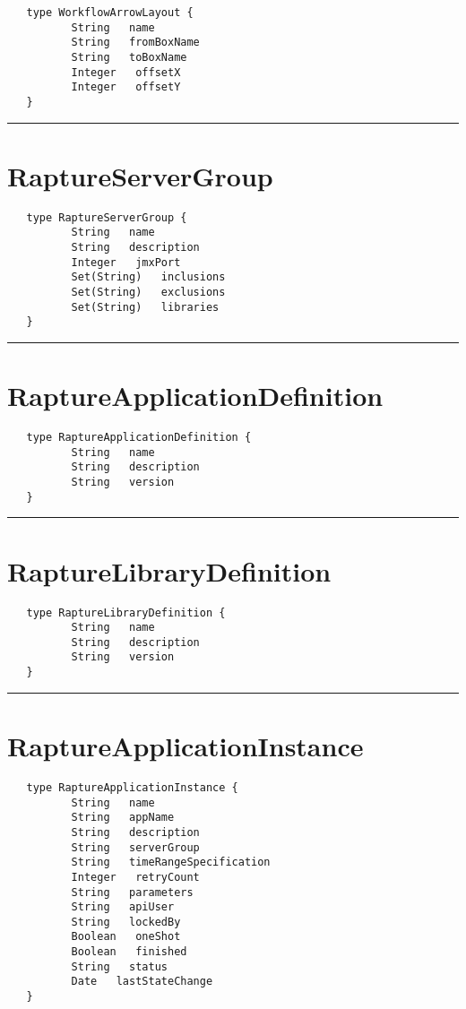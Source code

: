 \begin{verbatim}
   type WorkflowArrowLayout {
          String   name
          String   fromBoxName
          String   toBoxName
          Integer   offsetX
          Integer   offsetY
   }
\end{verbatim}

\rule{12cm}{2pt}
\section{RaptureServerGroup}
\label{type:RaptureServerGroup}

\begin{verbatim}
   type RaptureServerGroup {
          String   name
          String   description
          Integer   jmxPort
          Set(String)   inclusions
          Set(String)   exclusions
          Set(String)   libraries
   }
\end{verbatim}

\rule{12cm}{2pt}
\section{RaptureApplicationDefinition}
\label{type:RaptureApplicationDefinition}

\begin{verbatim}
   type RaptureApplicationDefinition {
          String   name
          String   description
          String   version
   }
\end{verbatim}

\rule{12cm}{2pt}
\section{RaptureLibraryDefinition}
\label{type:RaptureLibraryDefinition}

\begin{verbatim}
   type RaptureLibraryDefinition {
          String   name
          String   description
          String   version
   }
\end{verbatim}

\rule{12cm}{2pt}
\section{RaptureApplicationInstance}
\label{type:RaptureApplicationInstance}

\begin{verbatim}
   type RaptureApplicationInstance {
          String   name
          String   appName
          String   description
          String   serverGroup
          String   timeRangeSpecification
          Integer   retryCount
          String   parameters
          String   apiUser
          String   lockedBy
          Boolean   oneShot
          Boolean   finished
          String   status
          Date   lastStateChange
   }
\end{verbatim}

